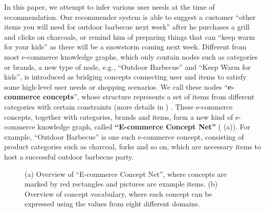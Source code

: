 In this paper, we attempt to infer various user needs at the time of recommendation. 
Our recommender system is able to suggest a customer 
``other items you will need for outdoor barbecue next week'' 
after he purchases a grill and clicks on charcoals,
or remind him of preparing things that can ``keep warm for your kids'' as 
there will be a snowstorm coming next week.
Different from most e-commerce knowledge graphs, which only contain
nodes such as categories or brands, a new type of node, e.g.,
``Outdoor Barbecue'' and ``Keep Warm for kids'', is introduced as 
bridging concepts connecting user and items to satisfy some 
high-level user needs or shopping scenarios. 
We call these nodes ``\textbf{e-commerce concepts}'',
whose structure represents a set of items from different categories 
with certain constraints (more details in ) .
These e-commerce concepts, together with categories, brands and items, 
form a new kind of e-commerce knowledge graph, called
\textbf{``E-commerce Concept Net''} ( (a)). 
For example, ``Outdoor Barbecue'' is one such e-commerce concept,  
consisting of product categories such as charcoal, forks and so on, 
which are necessary items to host a successful outdoor barbecue party.
\begin{figure*}[th]
	\centering
	\caption{(a) Overview of ``E-commerce Concept Net'', where concepts are marked by red rectangles and pictures are  example items. (b) Overview of concept vocabulary, where each concept can be expressed using the values from eight different domains.}
	\label{fig:kg}
\end{figure*}


